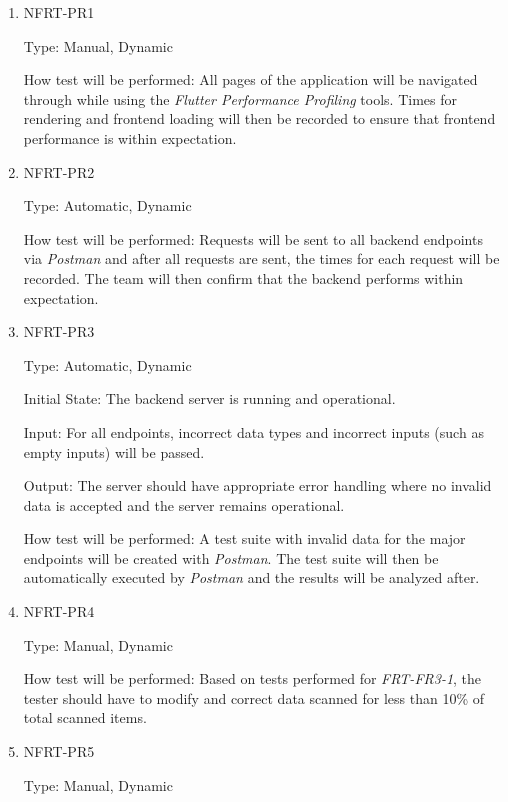 \documentclass[12pt, titlepage]{article}
\begin{document}
\begin{enumerate}
  \item{NFRT-PR1\\}

  Type: Manual, Dynamic

  How test will be performed: All pages of the application will be navigated through while using the
  \textit{Flutter Performance Profiling} tools. Times for rendering and frontend loading will then be recorded
  to ensure that frontend performance is within expectation.

  \item{NFRT-PR2\\}

  Type: Automatic, Dynamic

  How test will be performed: Requests will be sent to all backend endpoints via \textit{Postman} and after
  all requests are sent, the times for each request will be recorded. The team will then confirm that
  the backend performs within expectation.

  \item{NFRT-PR3\\}

  Type: Automatic, Dynamic

  Initial State: The backend server is running and operational.

  Input: For all endpoints, incorrect data types and incorrect inputs (such as empty inputs) will be passed.

  Output: The server should have appropriate error handling where no invalid data is accepted and the server
  remains operational.

  How test will be performed: A test suite with invalid data for the major endpoints will be created with
  \textit{Postman}. The test suite will then be automatically executed by \textit{Postman} and the results
  will be analyzed after.

  \item{NFRT-PR4\\}
  
  Type: Manual, Dynamic

  How test will be performed: Based on tests performed for \textit{FRT-FR3-1}, the tester should have to
  modify and correct data scanned for less than 10\% of total scanned items.

  \item{NFRT-PR5\\}

  Type: Manual, Dynamic


\end{enumerate}
\end{document}
